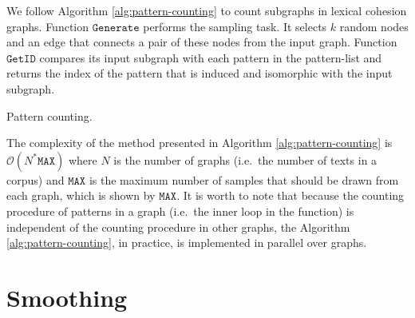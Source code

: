 We follow Algorithm \ref{alg:pattern-counting} to count subgraphs in lexical cohesion graphs.  
Function $\mathtt{Generate}$ performs the sampling task.  
It selects $k$ random nodes and an edge that connects a pair of these nodes from the input graph. 
Function $\mathtt{GetID}$ compares its input subgraph with each pattern in the pattern-list and returns the index of the pattern that is induced and isomorphic with the input subgraph.  

\begin{algorithm}
    \begin{algorithmic}[1]
                \EndWhile
            \EndWhile
        \EndFunction
    \end{algorithmic}
    \caption{Pattern counting.}
    \label{alg:pattern-counting}
\end{algorithm}

The complexity of the method presented in Algorithm \ref{alg:pattern-counting} is $\mathcal{O}(N^ \ast \mathtt{MAX})$  where $N$ is the number of graphs (i.e.\ the number of texts in a corpus) and $\mathtt{MAX}$ is the maximum number of samples that should be drawn from each graph, which is shown by $\mathtt{MAX}$. 
It is worth to note that because the counting procedure of patterns in a graph (i.e.\ the inner loop in the function) is independent of the counting procedure in other graphs, the Algorithm \ref{alg:pattern-counting}, in practice, is implemented in parallel over graphs. 
  
\section{Smoothing} 
\label{sec:lex-graph-smoothing}

